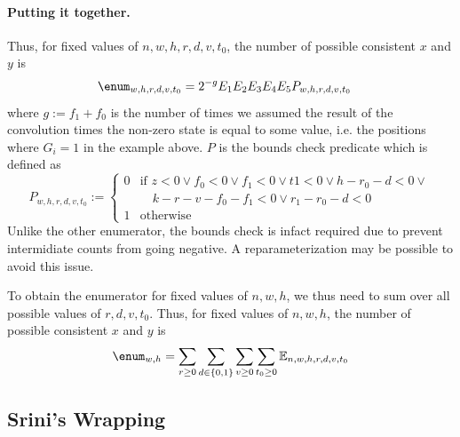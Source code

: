 \paragraph{Putting it together.}
Thus, for fixed values of $n,w,h,r,d,v,t_0$, the number of possible consistent $x$ and $y$ is
\begin{align*}
  \enum_{w,h,r,d,v,t_0} &= 2^{-g}E_1E_2E_3E_4E_5 P_{w,h,r,d, v, t_0}
\end{align*}
where $g:=f_1+f_0$ is the number of times we assumed the result of the convolution times the non-zero state is equal to some value, i.e. the positions where $G_i=1$ in the example above. $P$ is the bounds check predicate which is defined as
$$
P_{w,h,r,d, v, t_0} :=
\begin{cases}
  0 & \text{if } z<0 \vee f_0 <0 \vee f_1 <0 \vee t1 < 0 \vee h-r_0-d < 0 \vee\\
  &\quad  k - r - v - f_0 - f_1 < 0 \vee r_1-r_0 -d < 0\\
  1 & \text{otherwise }
\end{cases}
$$
Unlike the other enumerator, the bounds check is infact required due to prevent intermidiate counts from going negative. A reparameterization may be possible to avoid this issue.

To obtain the enumerator for fixed values of $n,w,h$, we thus need to sum over all possible values of $r,d,v,t_0$.
Thus, for fixed values of $n,w,h$, the number of possible consistent $x$ and $y$ is
$$
\enum_{w,h} = \sum_{r\geq 0}\sum_{d\in \{0, 1\}}\sum_{v\geq 0}\sum_{t_0\geq 0}\mathbb{E}_{n,w,h,r,d,v,t_0}
$$

\subsection{Srini's Wrapping}

